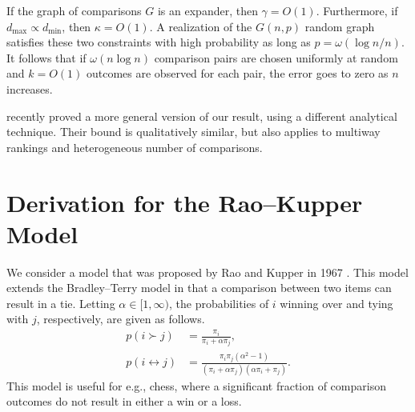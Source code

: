 If the graph of comparisons $G$ is an expander, then $\gamma = O(1)$.
Furthermore, if $d_{\max} \propto d_{\min}$, then $\kappa = O(1)$.
A realization of the $G(n, p)$ random graph satisfies these two constraints with high probability as long as $p = \omega(\log n / n)$.
It follows that if $\omega(n \log n)$ comparison pairs are chosen uniformly at random and $k = O(1)$ outcomes are observed for each pair, the error goes to zero as $n$ increases.

\citet{hajek2014minimax} recently proved a more general version of our result, using a different analytical technique.
Their bound is qualitatively similar, but also applies to multiway rankings and heterogeneous number of comparisons.

\section{Derivation for the Rao--Kupper Model}

We consider a model that was proposed by Rao and Kupper in 1967 \citep{rao1967ties}.
This model extends the Bradley--Terry model in that a comparison between two items can result in a tie.
Letting $\alpha \in [1, \infty)$, the probabilities of $i$ winning over and tying with $j$, respectively, are given as follows.
\begin{align*}
p(i \succ j) &= \frac{\pi_i}{\pi_i + \alpha \pi_j}, \\
p(i \leftrightarrow j) &= \frac{\pi_i \pi_j(\alpha^2 - 1)}{(\pi_i + \alpha\pi_j)(\alpha \pi_i + \pi_j)}.
\end{align*}
This model is useful for e.g., chess, where a significant fraction of comparison outcomes do not result in either a win or a loss.

